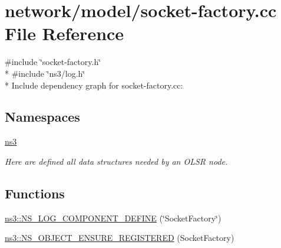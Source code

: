 \hypertarget{socket-factory_8cc}{}\section{network/model/socket-\/factory.cc File Reference}
\label{socket-factory_8cc}
{\ttfamily \#include \char`\"{}socket-\/factory.\+h\char`\"{}}\\*
{\ttfamily \#include \char`\"{}ns3/log.\+h\char`\"{}}\\*
Include dependency graph for socket-\/factory.cc\+:
\subsection*{Namespaces}
\begin{DoxyCompactItemize}
\item 
 \hyperlink{namespacens3}{ns3}
\begin{DoxyCompactList}\small\item\em Here are defined all data structures needed by an O\+L\+SR node. \end{DoxyCompactList}\end{DoxyCompactItemize}
\subsection*{Functions}
\begin{DoxyCompactItemize}
\item 
\hyperlink{namespacens3_a62c208d5aa22ca00608ff72ec19d0d0c}{ns3\+::\+N\+S\+\_\+\+L\+O\+G\+\_\+\+C\+O\+M\+P\+O\+N\+E\+N\+T\+\_\+\+D\+E\+F\+I\+NE} (\char`\"{}Socket\+Factory\char`\"{})
\item 
\hyperlink{namespacens3_a17167bd08d5deda200754e45d56eb43d}{ns3\+::\+N\+S\+\_\+\+O\+B\+J\+E\+C\+T\+\_\+\+E\+N\+S\+U\+R\+E\+\_\+\+R\+E\+G\+I\+S\+T\+E\+R\+ED} (Socket\+Factory)
\end{DoxyCompactItemize}
